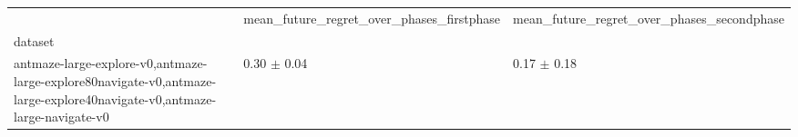 \begin{tabular}{lll}
\toprule
 & mean_future_regret_over_phases_firstphase & mean_future_regret_over_phases_secondphase \\
dataset &  &  \\
\midrule
antmaze-large-explore-v0,antmaze-large-explore80navigate-v0,antmaze-large-explore40navigate-v0,antmaze-large-navigate-v0 & 0.30 $\pm$ 0.04 & 0.17 $\pm$ 0.18 \\
\bottomrule
\end{tabular}
